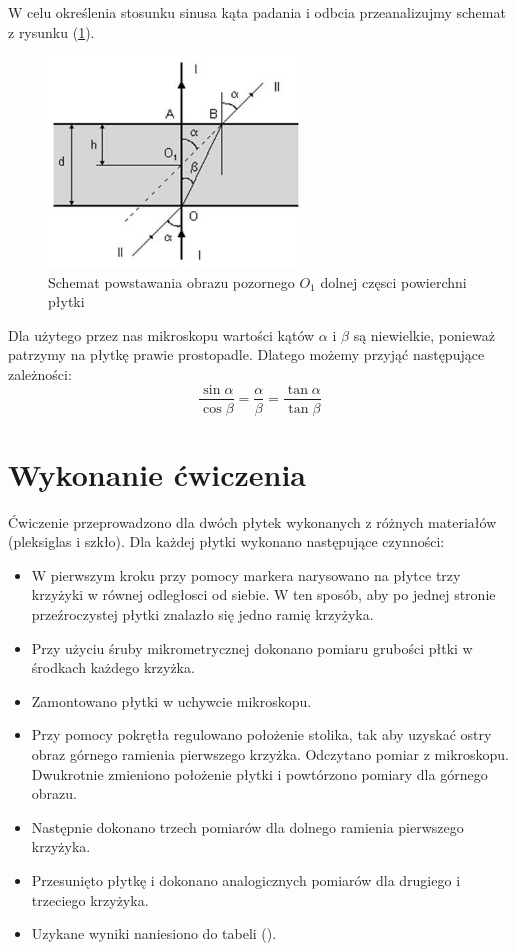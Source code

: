 \documentclass [a4paper,11pt]{article}
\begin{document}
	W celu określenia stosunku sinusa kąta padania i odbcia przeanalizujmy schemat z rysunku (\ref{fig:schemat}). 
	\begin{center}
			\begin{figure}[!h]
			\label{fig:schemat}
			\caption{Schemat powstawania obrazu pozornego $O_1$ dolnej częsci powierchni płytki }
			\includegraphics[width=0.6\textwidth]{schemat_zalamanie}
		\end{figure}
	\end{center}

	
	Dla użytego przez nas mikroskopu wartości kątów $\alpha$ i $\beta$ są niewielkie, ponieważ patrzymy na płytkę prawie prostopadle. Dlatego możemy przyjąć następujące zależności:
	\begin{equation}
		\frac{\sin \alpha}{\cos \beta}=\frac{ \alpha}{ \beta}=\frac{\tan \alpha}{\tan \beta}
	\end{equation}
	
		
	\section{Wykonanie ćwiczenia}
	Ćwiczenie przeprowadzono dla dwóch płytek wykonanych z różnych materiałów (pleksiglas i szkło).
	Dla każdej płytki wykonano następujące czynności:
	\begin{itemize}
		\item W pierwszym kroku przy pomocy markera narysowano na płytce trzy krzyżyki w równej odległosci od siebie.
		W ten sposób, aby po jednej stronie przeźroczystej płytki znalazło się jedno ramię krzyżyka.
		\item 
			Przy użyciu śruby mikrometrycznej dokonano pomiaru grubości płtki w 
			środkach każdego krzyżka.
		\item Zamontowano płytki w uchywcie mikroskopu. 
		\item Przy pomocy pokrętła regulowano położenie stolika, tak aby uzyskać ostry obraz 
		górnego ramienia pierwszego krzyżka.  Odczytano pomiar z mikroskopu. Dwukrotnie zmieniono położenie płytki i powtórzono pomiary dla górnego obrazu.
		\item Następnie dokonano trzech pomiarów dla dolnego ramienia pierwszego krzyżyka.
		\item Przesunięto płytkę i dokonano analogicznych pomiarów dla drugiego i trzeciego krzyżyka.
		\item Uzykane wyniki naniesiono do tabeli ().  
	\end{itemize}
	
\end{document}
